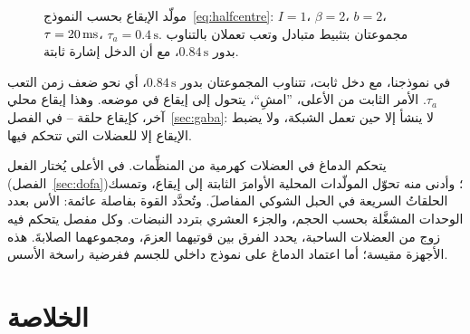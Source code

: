 \begin{figure}[t]
\centering
{}
\caption{مولّد الإيقاع بحسب النموذج~\eqref{eq:halfcentre}: $I=1$، $\beta=2$، $b=2$، $\tau=20\,\text{ms}$، $\tau_a=0.4\,\text{s}$. مجموعتان بتثبيط متبادل وتعب تعملان بالتناوب بدور $0.84\,\text{s}$، مع أن الدخل إشارة ثابتة.}
\label{fig:halfcentre}
\end{figure}

في نموذجنا، مع دخل ثابت، تتناوب المجموعتان بدور $0.84\,\text{s}$، أي نحو ضعف زمن التعب $\tau_a$. الأمر الثابت من الأعلى، ”امشِ“، يتحول إلى إيقاع في موضعه. وهذا إيقاع محلي آخر، كإيقاع حلقة \foreignlanguage{english}{--} في الفصل~\ref{sec:gaba}: لا ينشأ إلا حين تعمل الشبكة، ولا يضبط الإيقاع إلا للعضلات التي تتحكم فيها.

\begin{keyblock}
\begin{proposition}
\label{prop:muscles}
يتحكم الدماغ في العضلات كهرمية من المنظِّمات. في الأعلى يُختار الفعل (الفصل~\ref{sec:dofa})؛ وأدنى منه تحوّل المولّدات المحلية الأوامرَ الثابتة إلى إيقاع، وتمسك الحلقاتُ السريعة في الحبل الشوكي المفاصلَ. وتُحدَّد القوة بفاصلة عائمة: الأس بعدد الوحدات المشغَّلة بحسب الحجم، والجزء العشري بتردد النبضات. وكل مفصل يتحكم فيه زوج من العضلات الساحبة، يحدد الفرق بين قوتيهما العزمَ، ومجموعهما الصلابةَ. هذه الأجهزة مقيسة؛ أما اعتماد الدماغ على نموذج داخلي للجسم ففرضية راسخة الأسس.
\end{proposition}
\end{keyblock}

\section{الخلاصة}

